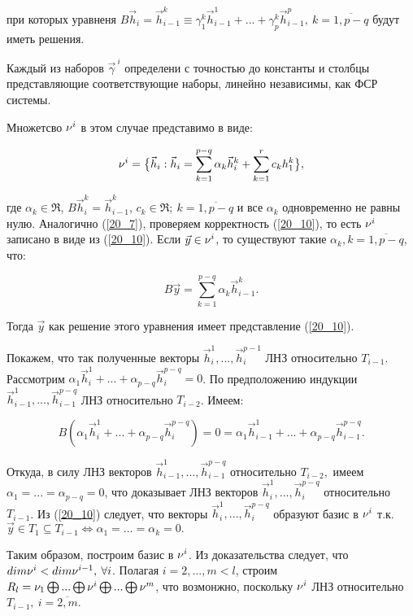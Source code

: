 \documentclass[a4paper, 12pt]{article}
\begin{document}
при которых уравненя $B\vec{h}_i = \vec{h}_{i-1}^k \equiv \gamma_1^k \vec{h}_{i-1}^1 + ... + \gamma_p^k \vec{h}_{i-1}^p, \: k = \overline{1, p-q}$ будут иметь решения.

Каждый из наборов $\vec{\gamma}^{\: i}$ определени с точностью до константы и столбцы представляющие соответствующие наборы, линейно независимы, как ФСР системы.

Множетсво $\nu^i$ в этом случае представимо в виде:

\begin{equation}\label{20_10}
\nu^i = \big\lbrace \vec{h}_i: \vec{h}_i = \sum\limits_{k=1}^{p-q}\alpha_k \vec{h}_i^k + \sum\limits_{k=1}^r c_k h_1^k \big\rbrace,
\end{equation}

где $\alpha_k \in  \Re$, $B \vec{h}_i^k = \vec{h}_{i-1}^k$, $c_k \in \Re; \: k = \overline{1, p-q}$ и все $\alpha_k$ одновременно не равны нулю. Аналогично (\ref{20_7}), проверяем корректность (\ref{20_10}), то есть $\nu^i$ записано в виде из (\ref{20_10}). Если $\vec{y} \in \nu^i$, то существуют такие $\alpha_k, k = \overline{1, p-q}$, что:

\[B \vec{y} = \sum\limits_{k=1}^{p-q} \alpha_k \vec{h}_{i-1}^k.\]

Тогда $\vec{y}$ как решение этого уравнения имеет представление (\ref{20_10}).

Покажем, что так полученные векторы $\vec{h}_i^1, ... , \vec{h}_i^{p-1}$ ЛНЗ относительно $T_{i-1}$. Рассмотрим $\alpha_1 \vec{h}_i^1 + ... + \alpha_{p-q} \vec{h}_i^{p-q} = 0$. По предположению индукции $\vec{h}_{i-1}^1, ... , \vec{h}_{i-1}^{p-q}$ ЛНЗ относительно $T_{i-2}$. Имеем:

\[B(\alpha_1 \vec{h}_i^1 + ... + \alpha_{p-q}\vec{h}_i^{p-q}) = 0 = \alpha_1 \vec{h}_{i-1}^1 + ... + \alpha_{p-q} \vec{h}_{i-1}^{p-q}.\]

Откуда, в силу ЛНЗ векторов $\vec{h}_{i-1}^1, ... ,\vec{h}_{i-1}^{p-q}$ относительно $T_{i-2},$ имеем $\alpha_1 = ... = \alpha_{p-q} = 0$, что доказывает ЛНЗ векторов $\vec{h}_i^1, ... , \vec{h}_i^{p-q}$ относительно $T_{i-1}$. Из (\ref{20_10}) следует, что векторы $\vec{h}_i^1, ... , \vec{h}_i^{p-q}$ образуют базис в $\nu^i$ т.к. $\vec{y} \in T_1\subseteq T_{i-1} \Leftrightarrow \alpha_1 = ... = \alpha_k = 0.$

Таким образом, построим базис в $\nu^i$. Из доказательства следует, что $dim \nu^i < dim \nu^{i-1}, \: \forall i$. Полагая $i = 2, ... ,m < l$, строим $R_l = \nu_1 \bigoplus ... \bigoplus \nu^i \bigoplus ... \bigoplus \nu^m$, что возмонжно, поскольку $\nu^i$ ЛНЗ относительно $T_{i-1}, \: i = \overline{2,m}$.
\end{document}
